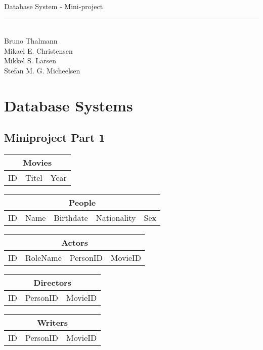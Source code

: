 
\newcommand{\HRule}{\rule{\linewidth}{0.5mm}}


\begin{titlepage}
\centering
{\LARGE Database System - Mini-project}
\HRule \\[0.5cm]
Bruno Thalmann\\
			Mikael E. Christensen\\
			Mikkel S. Larsen\\
			Stefan M. G. Micheelsen
\end{titlepage}

\chapter*{Database Systems}

\section{Miniproject Part 1}

\begin{tabular}{|l|l|l|}
\hline
\multicolumn{3}{|c|}{Movies} \\ \hline
ID & Titel & Year \\ \hline
\end{tabular}

\begin{tabular}{|l|l|l|l|l|}
\hline
\multicolumn{5}{|c|}{People} \\ \hline
ID & Name & Birthdate & Nationality & Sex \\ \hline
\end{tabular}

\begin{tabular}{|l|l|l|l|}
\hline
\multicolumn{4}{|c|}{Actors} \\ \hline
ID & RoleName & PersonID & MovieID \\ \hline
\end{tabular}

\begin{tabular}{|l|l|l|}
\hline
\multicolumn{3}{|c|}{Directors} \\ \hline
ID & PersonID & MovieID \\ \hline
\end{tabular}

\begin{tabular}{|l|l|l|}
\hline
\multicolumn{3}{|c|}{Writers} \\ \hline
ID & PersonID & MovieID\\ \hline
\end{tabular}

